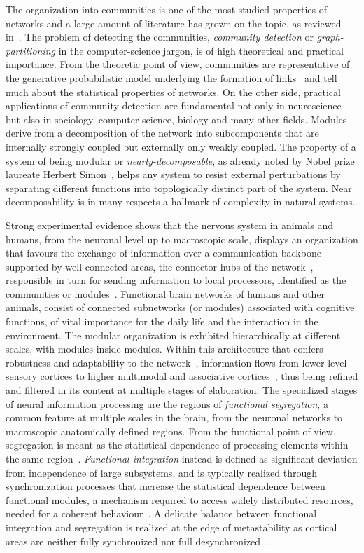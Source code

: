The organization into communities is one of the most studied properties of networks and a large amount of literature has grown on the topic, as reviewed in~\cite{fortunato2010}.
The problem of detecting the communities, \emph{community detection} or \emph{graph-partitioning} in the computer-science jargon, is of high theoretical and practical importance.
From the theoretic point of view, communities are representative of the generative probabilistic model underlying the formation of links~\cite{karrer2011} and tell much about the statistical properties of networks.
On the other side, practical applications of community detection are fundamental not only in neuroscience but also in sociology, computer science, biology and many other fields.
Modules derive from a decomposition of the network into subcomponents that are internally strongly coupled but externally only weakly coupled.
The property of a system of being modular or \emph{nearly-decomposable}, as already noted by Nobel prize laureate Herbert Simon~\cite{simon1991}, helps any system to resist external perturbations by separating different functions into topologically distinct part of the system.
Near decomposability is in many respects a hallmark of complexity in natural systems\cite{simon1991}.

Strong experimental evidence shows that the nervous system in animals and humans, from the neuronal level up to macroscopic scale, displays an organization that favours the exchange of information over a communication backbone supported by well-connected areas, the connector hubs of the network~\cite{dereus2013a}, responsible in turn for sending information to local processors, identified as the communities or modules~\cite{vandenheuvel2013a}.
Functional brain networks of humans and other animals, consist of connected subnetworks (or modules) associated with cognitive functions, of vital importance for the daily life and the interaction in the environment.
The modular organization is exhibited hierarchically at different scales, with modules inside modules.
Within this architecture that confers robustness and adaptability to the network~\cite{meunier2010}, information flows from lower level sensory cortices to higher multimodal and associative cortices~\cite{mumford1992}, thus being refined and filtered in its content at multiple stages of elaboration.
The specialized stages of neural information processing are the regions of \emph{functional segregation}, a common feature at multiple scales in the brain, from the neuronal networks to macroscopic anatomically defined regions.
From the functional point of view, segregation is meant as the statistical dependence of processing elements within the same region~\cite{tononi1994}.
\emph{Functional integration} instead is defined as significant deviation from independence of large subsystems, and is typically realized through synchronization processes that increase the statistical dependence between functional modules, a mechanism required to access widely distributed resources, needed for a coherent behaviour~\cite{tononi1998}.
A delicate balance between functional integration and segregation is realized at the edge of metastability as cortical areas are neither fully synchronized nor full desynchronized~\cite{friston1997}.


